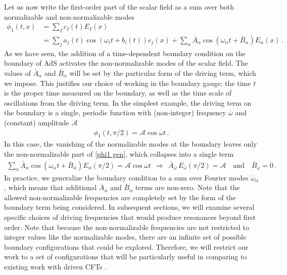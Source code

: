 \documentclass[letterpaper,11pt]{article}
\newcommand{\oi}{\omega_i}
\newcommand{\mc}{\mathcal}
\newcommand{\ob}{\overline{\omega}}
\begin{document}
Let us now write the first-order part of the scalar field as a sum over both normalizable and non-normalizable modes
\begin{align}
\label{phi1 gen}
\phi_1(t,x) &= \sum_I c_I (t)  E_I (x) \nonumber \\
&= \sum_j a_j (t) \cos \left( \oi t + b_i(t) \right) e_j(x) + \sum_\alpha \bar A_\alpha \cos \left( \omega_\alpha t + \bar{B}_\alpha \right) E_\alpha(x) \, .
\end{align}
As we have seen, the addition of a time-dependent boundary condition on the boundary of AdS activates the non-normalizable modes of the scalar field. The values of $\bar A_\alpha$ and $\bar{B}_\alpha$ will be set by the particular form of the driving term, which we impose. This justifies our choice of working in the boundary gauge; the time $t$ is the proper time measured on the boundary, as well as the time scale of oscillations from the driving term. In the simplest example, the driving term on the boundary is a single, periodic function with (non-integer) frequency $\ob$ and (constant) amplitude $\mc A$
\begin{align}
\label{BC}
\phi_1(t,\pi/2) = \mc A \cos \ob t \, .
\end{align}
In this case, the vanishing of the normalizable modes at the boundary leaves only the non-normalizable part of \eqref{phi1 gen}, which collapses into a single term
\begin{align}
\sum_\alpha \bar A_\alpha \cos (\omega_\alpha t + \bar B_\alpha )  E_{\alpha} (\pi / 2) = \mc A \cos \ob t \:\: \Rightarrow \:\: \bar A_{\ob} \, E_{\ob} (\pi / 2) = \mc A \quad \text{and} \quad \bar B_{\ob} = 0 \, .
\end{align}
In practice, we generalize the boundary condition to a sum over Fourier modes $\ob_\alpha$, which means that additional $\bar A_\alpha$ and $\bar B_\alpha$ terms are non-zero. Note that the allowed non-normalizable frequencies
are completely set by the form of the boundary term being considered. In subsequent sections, we will examine several specific choices of driving frequencies that would produce resonances beyond first order. Note that because the non-normalizable frequencies are not restricted to integer values like the normalizable modes, there are an infinite set of possible boundary configurations that could be explored. Therefore, we will restrict our work to a set of configurations that will be particularly useful in comparing to existing work with driven CFTs \cite{1712.07637, 1502.05726, 1612.07701, 1805.00031}.
\end{document}

